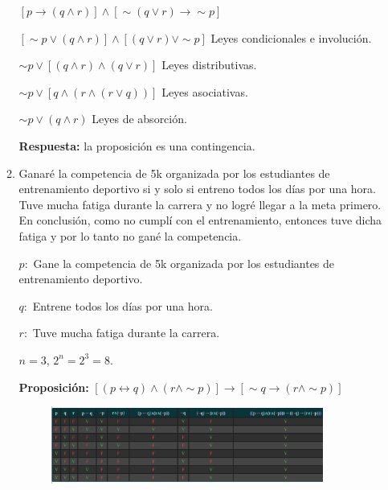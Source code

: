 \documentclass[12pt]{article}
\begin{document}
\begin{itemize}
\begin{enumerate}
                        \par{\large$[p \longrightarrow (q \wedge r)] \wedge [\sim (q \vee r) \longrightarrow \sim p]$} \vspace{0.5cm}
                        \par$[\sim p \vee (q \wedge r)] \wedge [(q \vee r) \vee \sim p]$ {\footnotesize Leyes condicionales e involución.}
                        \par$\sim p \vee [(q \wedge r) \wedge (q \vee r)]$ {\footnotesize Leyes distributivas.}
                        \par$\sim p \vee [q \wedge (r \wedge (r \vee q))]$ {\footnotesize Leyes asociativas.}
                        \par$\sim p \vee (q \wedge r)$ {\footnotesize Leyes de absorción.} \vspace{0.5cm}
                        \par\textbf{Respuesta: } la proposición es una contingencia. \vspace{0.5cm}

                   
                    \newpage
                    \item Ganaré la competencia de 5k organizada por los estudiantes de entrenamiento deportivo si y solo si entreno todos los días por una hora. Tuve mucha fatiga durante la carrera y no logré llegar a la meta primero. En conclusión, como no cumplí con el entrenamiento, entonces tuve dicha fatiga y por lo tanto no gané la competencia.
                        \par$p:$ Gane la competencia de 5k organizada por los estudiantes de entrenamiento deportivo.
                        \par$q:$ Entrene todos los días por una hora.
                        \par$r:$ Tuve mucha fatiga durante la carrera.
                        \par$n = 3$, $2^n = 2^3 = 8.$ \vspace{0.5cm}
                        \par\textbf{Proposición: }$[(p \leftrightarrow q) \wedge (r \wedge \sim p)] \longrightarrow [\sim q \longrightarrow (r \wedge \sim p)]$\vspace{0.5cm}

                        \begin{figure}[!h]
                            \centering
                            \includegraphics[width=0.9\textwidth]{Img/Tarea8_a_ej3.png}
                        \end{figure} \vspace{0.5cm}


\end{enumerate}
\end{itemize}
\end{document}
